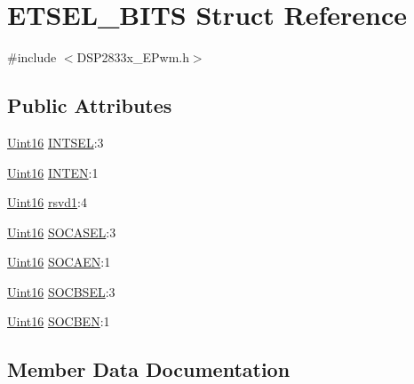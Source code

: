 \hypertarget{struct_e_t_s_e_l___b_i_t_s}{}\section{E\+T\+S\+E\+L\+\_\+\+B\+I\+T\+S Struct Reference}
\label{struct_e_t_s_e_l___b_i_t_s}


{\ttfamily \#include $<$D\+S\+P2833x\+\_\+\+E\+Pwm.\+h$>$}

\subsection*{Public Attributes}
\begin{DoxyCompactItemize}
\item 
\hyperlink{_d_s_p2833x___device_8h_a59a9f6be4562c327cbfb4f7e8e18f08b}{Uint16} \hyperlink{struct_e_t_s_e_l___b_i_t_s_a68173ce0fb311ca5926051c447b00fac}{I\+N\+T\+S\+E\+L}\+:3
\item 
\hyperlink{_d_s_p2833x___device_8h_a59a9f6be4562c327cbfb4f7e8e18f08b}{Uint16} \hyperlink{struct_e_t_s_e_l___b_i_t_s_a69d1edf956ca42ad4cc04f3f84c93459}{I\+N\+T\+E\+N}\+:1
\item 
\hyperlink{_d_s_p2833x___device_8h_a59a9f6be4562c327cbfb4f7e8e18f08b}{Uint16} \hyperlink{struct_e_t_s_e_l___b_i_t_s_a6fa2b8302862329ee6d6f07dae0afcdd}{rsvd1}\+:4
\item 
\hyperlink{_d_s_p2833x___device_8h_a59a9f6be4562c327cbfb4f7e8e18f08b}{Uint16} \hyperlink{struct_e_t_s_e_l___b_i_t_s_a1ece835f2fe541c1281d5ee029478ff3}{S\+O\+C\+A\+S\+E\+L}\+:3
\item 
\hyperlink{_d_s_p2833x___device_8h_a59a9f6be4562c327cbfb4f7e8e18f08b}{Uint16} \hyperlink{struct_e_t_s_e_l___b_i_t_s_a7ae7a05e912a4ac2c47789711c705fe8}{S\+O\+C\+A\+E\+N}\+:1
\item 
\hyperlink{_d_s_p2833x___device_8h_a59a9f6be4562c327cbfb4f7e8e18f08b}{Uint16} \hyperlink{struct_e_t_s_e_l___b_i_t_s_a6616efc33d6cefacf585954ecdf35202}{S\+O\+C\+B\+S\+E\+L}\+:3
\item 
\hyperlink{_d_s_p2833x___device_8h_a59a9f6be4562c327cbfb4f7e8e18f08b}{Uint16} \hyperlink{struct_e_t_s_e_l___b_i_t_s_ad5afc2b9ad38f8b1f95c67f9597406c1}{S\+O\+C\+B\+E\+N}\+:1
\end{DoxyCompactItemize}


\subsection{Member Data Documentation}
\hypertarget{struct_e_t_s_e_l___b_i_t_s_a69d1edf956ca42ad4cc04f3f84c93459}{}
